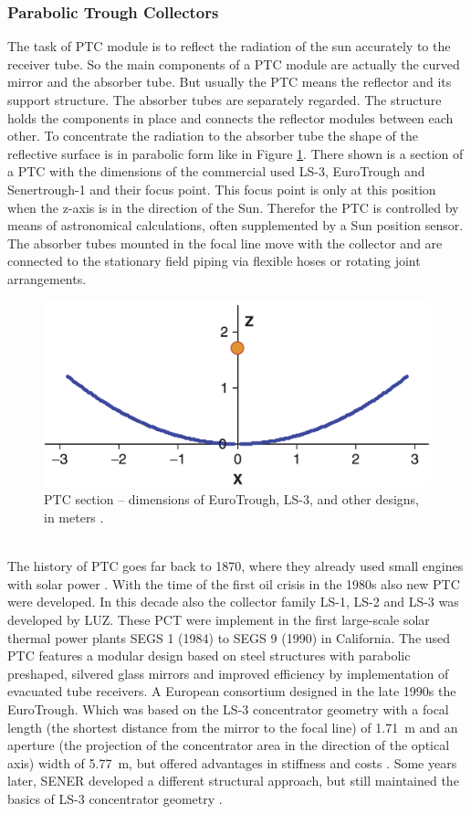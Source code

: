 \documentclass[Master,MEE,english]{twbook}%
\begin{document}
\subsubsection{Parabolic Trough Collectors}
The task of PTC module is to reflect the radiation of the sun accurately to the receiver tube. So the main components of a PTC module are actually the curved mirror and the absorber tube. But usually the PTC means the reflector and its support structure. The absorber tubes are separately regarded. The structure holds the components in place and connects the reflector modules between each other. To concentrate the radiation to the absorber tube the shape of the reflective surface is in parabolic form like in Figure \ref{PTC_section}. There shown is a section of a PTC with the dimensions of the commercial used LS-3, EuroTrough and Senertrough-1 and their focus point. This focus point is only at this position when the z-axis is in the direction of the Sun. Therefor the PTC is controlled by means of astronomical calculations, often supplemented by a Sun position sensor. The absorber tubes mounted in the focal line move with the collector and are connected to the stationary field piping via flexible hoses or rotating joint arrangements.
\begin{figure}[!h] 
\centering
\includegraphics[width=0.6\linewidth]{FIG/PTC_section}
\caption[PTC section – dimensions of EuroTrough, LS-3, and other designs, in meters.]{PTC section – dimensions of EuroTrough, LS-3, and other designs, in meters \cite{Lupfert2013}.}\label{PTC_section}
\end{figure}
\\
The history of PTC goes far back to 1870, where they already used small engines with solar power \cite{Fernandez-Garcia2010}. With the time of the first oil crisis in the 1980s also new PTC were developed. In this decade also the collector family LS-1, LS-2 and LS-3 was developed by LUZ. These PCT  were implement in the first large-scale solar thermal power plants SEGS 1 (1984) to SEGS 9 (1990) in California. The used PTC features a modular design based on steel structures with parabolic preshaped, silvered glass mirrors and improved efficiency by implementation of evacuated tube receivers. A European consortium designed in the late 1990s the EuroTrough. Which was based on the LS-3 concentrator geometry with a focal length (the shortest distance from the mirror to the focal line) of 1.71~m and an aperture (the projection of the concentrator area in the direction of the optical axis) width of 5.77~m, but offered advantages in stiffness and costs \cite{Osuna2001}. Some years later, SENER developed a different structural approach, but still maintained the basics of LS-3 concentrator geometry \cite{Fernandez-Garcia2010}.
\end{document}

